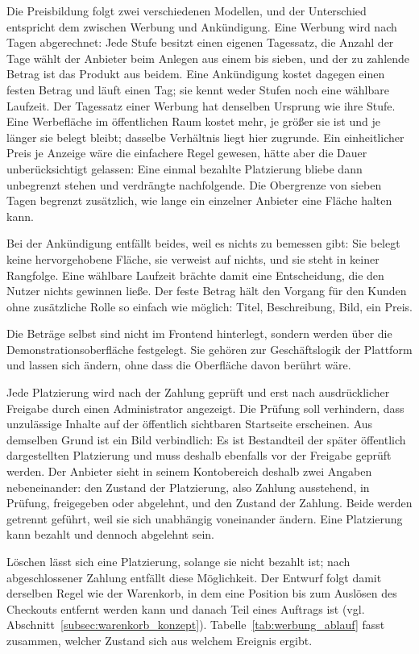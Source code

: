 Die Preisbildung folgt zwei verschiedenen Modellen, und der
Unterschied entspricht dem zwischen Werbung und Ankündigung. Eine
Werbung wird nach Tagen abgerechnet: Jede Stufe besitzt einen eigenen
Tagessatz, die Anzahl der Tage wählt der Anbieter beim Anlegen aus
einem bis sieben, und der zu zahlende Betrag ist das Produkt aus
beidem. Eine Ankündigung kostet dagegen einen festen Betrag und läuft
einen Tag; sie kennt weder Stufen noch eine wählbare Laufzeit.
Der Tagessatz einer Werbung hat denselben Ursprung wie ihre Stufe.
Eine Werbefläche im öffentlichen Raum kostet mehr, je größer sie ist
und je länger sie belegt bleibt; dasselbe Verhältnis liegt hier
zugrunde. Ein einheitlicher Preis je Anzeige wäre die einfachere
Regel gewesen, hätte aber die Dauer unberücksichtigt gelassen: Eine
einmal bezahlte Platzierung bliebe dann unbegrenzt stehen und
verdrängte nachfolgende. Die Obergrenze von sieben Tagen begrenzt
zusätzlich, wie lange ein einzelner Anbieter eine Fläche halten kann.

Bei der Ankündigung entfällt beides, weil es nichts zu bemessen gibt:
Sie belegt keine hervorgehobene Fläche, sie verweist auf nichts, und
sie steht in keiner Rangfolge. Eine wählbare Laufzeit brächte damit
eine Entscheidung, die den Nutzer nichts gewinnen ließe. Der feste
Betrag hält den Vorgang für den Kunden ohne zusätzliche Rolle so
einfach wie möglich: Titel, Beschreibung, Bild, ein Preis.

Die Beträge selbst sind nicht im Frontend hinterlegt, sondern
werden über die Demonstrationsoberfläche festgelegt. Sie gehören
zur Geschäftslogik der Plattform und lassen sich ändern, ohne dass
die Oberfläche davon berührt wäre.

Jede Platzierung wird nach der Zahlung geprüft und erst nach
ausdrücklicher Freigabe durch einen Administrator angezeigt. Die Prüfung soll verhindern, dass unzulässige Inhalte auf der
öffentlich sichtbaren Startseite erscheinen. Aus demselben Grund ist
ein Bild verbindlich: Es ist Bestandteil der später öffentlich
dargestellten Platzierung und muss deshalb ebenfalls vor der Freigabe
geprüft werden. Der Anbieter sieht in seinem Kontobereich deshalb zwei
Angaben nebeneinander: den Zustand der Platzierung, also Zahlung
ausstehend, in Prüfung, freigegeben oder abgelehnt, und den Zustand
der Zahlung. Beide werden getrennt geführt, weil sie sich unabhängig
voneinander ändern. Eine Platzierung kann bezahlt und dennoch
abgelehnt sein.

Löschen lässt sich eine Platzierung, solange sie nicht bezahlt ist;
nach abgeschlossener Zahlung entfällt diese Möglichkeit. Der Entwurf
folgt damit derselben Regel wie der Warenkorb, in dem eine Position
bis zum Auslösen des Checkouts entfernt werden kann und danach Teil
eines Auftrags ist (vgl. Abschnitt~\ref{subsec:warenkorb_konzept}).
Tabelle~\ref{tab:werbung_ablauf} fasst zusammen, welcher Zustand sich
aus welchem Ereignis ergibt.


